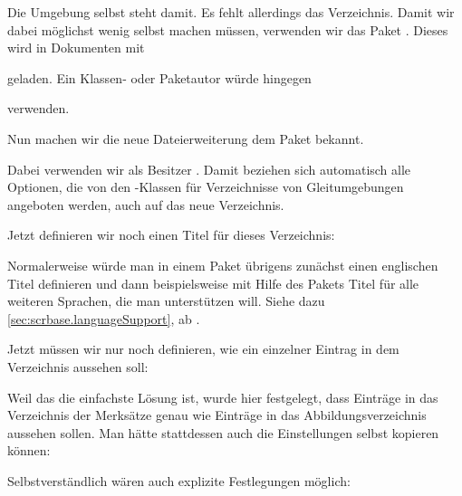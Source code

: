 Die Umgebung selbst steht damit. Es fehlt
allerdings das Verzeichnis. Damit wir dabei möglichst wenig selbst machen
müssen, verwenden wir das Paket . Dieses wird in Dokumenten
mit
\begin{lstcode}
  \usepackage{tocbasic}
\end{lstcode}
geladen. Ein Klassen- oder Paketautor würde hingegen
\begin{lstcode}
  \RequirePackage{tocbasic}
\end{lstcode}
verwenden.

Nun machen wir die neue Dateierweiterung dem Paket
 bekannt.
\begin{lstcode}
\end{lstcode}
Dabei verwenden wir als Besitzer . Damit beziehen sich
automatisch alle Optionen, die von den \KOMAScript-Klassen für Verzeichnisse
von Gleitumgebungen angeboten werden, auch auf das neue Verzeichnis.

Jetzt definieren wir noch einen Titel für dieses
Verzeichnis:
\begin{lstcode}
  \newcommand*{\listoflorname}{Verzeichnis der Merksätze}
\end{lstcode}
Normalerweise würde man in einem Paket übrigens zunächst einen englischen
Titel definieren und dann beispielsweise mit Hilfe des Pakets
 Titel für alle weiteren Sprachen, die man unterstützen
will. Siehe dazu \autoref{sec:scrbase.languageSupport}, ab
.

Jetzt müssen wir nur
noch definieren, wie ein einzelner Eintrag in dem Verzeichnis aussehen soll:
\begin{lstcode}
  \newcommand*{\l@remarkbox}{\l@figure}
\end{lstcode}
Weil das die einfachste Lösung ist, wurde hier festgelegt, dass Einträge in
das Verzeichnis der Merksätze genau wie Einträge in das Abbildungsverzeichnis
aussehen sollen. Man hätte stattdessen auch die Einstellungen selbst kopieren
können:
\begin{lstcode}
\end{lstcode}
Selbstverständlich wären auch explizite Festlegungen möglich:
\begin{lstcode}
\end{lstcode}

